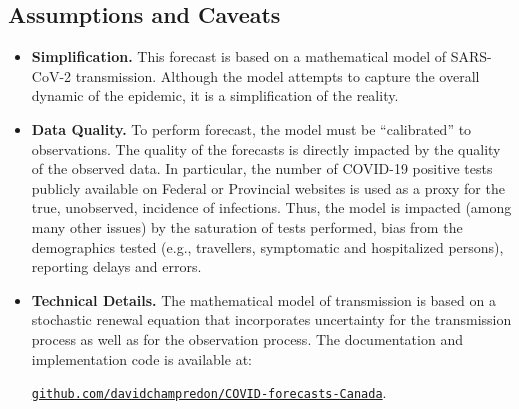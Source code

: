 \subsection*{Assumptions and Caveats}
\begin{itemize}

\item \textbf{Simplification.} This forecast is based on a mathematical model of SARS-CoV-2 transmission. Although the model attempts to capture the overall dynamic of the epidemic, it is a simplification of the reality.

\item \textbf{Data Quality.} To perform forecast, the model must be ``calibrated'' to observations. The quality of the forecasts is directly impacted by the quality of the observed data. 
In particular, the number of COVID-19 positive tests publicly available on Federal or Provincial websites is used as a proxy for the true, unobserved, incidence of infections. Thus, the model is impacted (among many other issues) by the saturation of tests performed, bias from the demographics tested (e.g., travellers, symptomatic and hospitalized persons), reporting delays and errors.

\item \textbf{Technical Details.} The mathematical model of transmission is based on a stochastic renewal equation that incorporates uncertainty for the transmission process as well as for the observation process. The documentation and implementation code is available at:

\texttt{\href{https://github.com/davidchampredon/COVID-forecasts-Canada}{github.com/davidchampredon/COVID-forecasts-Canada}}.


\end{itemize}

